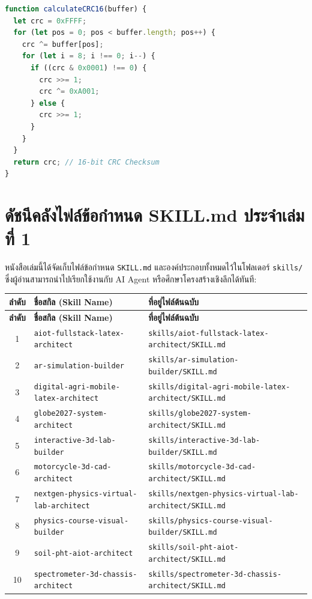 \begin{lstlisting}[language=JavaScript, caption={Modbus CRC16 Verification Function}]
function calculateCRC16(buffer) {
  let crc = 0xFFFF;
  for (let pos = 0; pos < buffer.length; pos++) {
    crc ^= buffer[pos];
    for (let i = 8; i !== 0; i--) {
      if ((crc & 0x0001) !== 0) {
        crc >>= 1;
        crc ^= 0xA001;
      } else {
        crc >>= 1;
      }
    }
  }
  return crc; // 16-bit CRC Checksum
}
\end{lstlisting}


\section{ดัชนีคลังไฟล์ข้อกำหนด SKILL.md ประจำเล่มที่ 1}

หนังสือเล่มนี้ได้จัดเก็บไฟล์ข้อกำหนด \texttt{SKILL.md} และองค์ประกอบทั้งหมดไว้ในโฟลเดอร์ \texttt{skills/} ซึ่งผู้อ่านสามารถนำไปเรียกใช้งานกับ AI Agent หรือศึกษาโครงสร้างเชิงลึกได้ทันที:

\small
\begin{longtable}{|c|p{}|p{}|}
\hline
\textbf{ลำดับ} & \textbf{ชื่อสกิล (Skill Name)} & \textbf{ที่อยู่ไฟล์ต้นฉบับ} \\ \hline
\endfirsthead
\hline
\textbf{ลำดับ} & \textbf{ชื่อสกิล (Skill Name)} & \textbf{ที่อยู่ไฟล์ต้นฉบับ} \\ \hline
\endhead
1 & \texttt{aiot-fullstack-latex-architect} & \texttt{skills/aiot-fullstack-latex-architect/SKILL.md} \\ \hline
2 & \texttt{ar-simulation-builder} & \texttt{skills/ar-simulation-builder/SKILL.md} \\ \hline
3 & \texttt{digital-agri-mobile-latex-architect} & \texttt{skills/digital-agri-mobile-latex-architect/SKILL.md} \\ \hline
4 & \texttt{globe2027-system-architect} & \texttt{skills/globe2027-system-architect/SKILL.md} \\ \hline
5 & \texttt{interactive-3d-lab-builder} & \texttt{skills/interactive-3d-lab-builder/SKILL.md} \\ \hline
6 & \texttt{motorcycle-3d-cad-architect} & \texttt{skills/motorcycle-3d-cad-architect/SKILL.md} \\ \hline
7 & \texttt{nextgen-physics-virtual-lab-architect} & \texttt{skills/nextgen-physics-virtual-lab-architect/SKILL.md} \\ \hline
8 & \texttt{physics-course-visual-builder} & \texttt{skills/physics-course-visual-builder/SKILL.md} \\ \hline
9 & \texttt{soil-pht-aiot-architect} & \texttt{skills/soil-pht-aiot-architect/SKILL.md} \\ \hline
10 & \texttt{spectrometer-3d-chassis-architect} & \texttt{skills/spectrometer-3d-chassis-architect/SKILL.md} \\ \hline
\end{longtable}
\normalsize
